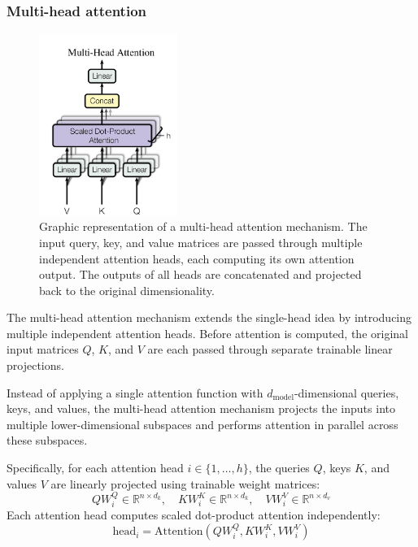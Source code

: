 \documentclass{pracalicmgr}
\begin{document}
\subsubsection{Multi-head attention}

\begin{figure}[h]
    \centering
    \includegraphics[width=0.4\textwidth]{src/multiHead.png}
    \caption{Graphic representation of a multi-head attention mechanism. The input query, key, and value matrices are passed through multiple independent attention heads, each computing its own attention output. The outputs of all heads are concatenated and projected back to the original dimensionality\cite{Vaswani2017Attention}.}
    \label{fig:multiHeadAttention}
\end{figure}

The multi-head attention mechanism extends the single-head idea by introducing multiple independent attention heads. Before attention is computed, the original input matrices \( Q \), \( K \), and \( V \) are each passed through separate trainable linear projections.

Instead of applying a single attention function with \( d_{\text{model}} \)-dimensional queries, keys, and values, the multi-head attention mechanism projects the inputs into multiple lower-dimensional subspaces and performs attention in parallel across these subspaces.

Specifically, for each attention head \( i \in \{1, \dots, h\} \), the queries \( Q \), keys \( K \), and values \( V \) are linearly projected using trainable weight matrices:
\[
QW_i^Q \in \mathbb{R}^{n \times d_k}, \quad KW_i^K \in \mathbb{R}^{n \times d_k}, \quad VW_i^V \in \mathbb{R}^{n \times d_v}
\]
Each attention head computes scaled dot-product attention independently:
\[
\text{head}_i = \text{Attention}(QW_i^Q, KW_i^K, VW_i^V)
\]
\end{document}
